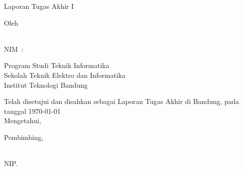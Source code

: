 
\begin{center}
  \smallskip
  \thispagestyle{empty}
  \Large \bfseries \MakeUppercase{\thetitle}
  \vfill

  \normalsize Laporan Tugas Akhir I
  \vfill

  \large Oleh
  
  \large \uppercase{\theauthor} \\
  \large NIM~:~\uppercase{\nim}

  \vfill

  \normalfont{}
  \normalsize Program Studi Teknik Informatika \\
  \normalsize Sekolah Teknik Elektro dan Informatika \\
  \normalsize Institut Teknologi Bandung \\
  \vfill

  \normalsize Telah disetujui dan disahkan sebagai Laporan Tugas Akhir di Bandung, pada tanggal \today \\
  \normalsize Mengetahui, \\
  \vfill

  Pembimbing,
  \vfill

  \underline{\supervisor{}} \\
  NIP.\@ \uppercase{\supervisornip{}} \\
  
\end{center}